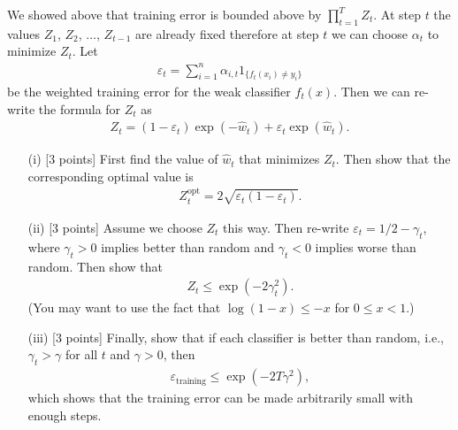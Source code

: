 \item {}  We showed above that training error is bounded above by $\prod_{t=1}^T Z_t$. At step $t$ the values $Z_1$, $Z_2$, $\ldots$, $Z_{t-1}$ are already fixed therefore at step $t$ we can choose $\alpha_t$ to minimize $Z_t$. Let
		\begin{align*}
			\varepsilon_t 
			= \sum_{i=1}^n \alpha_{i, t} 1_{\{f_t(x_i) \neq y_i\}}
		\end{align*}
	be the weighted training error for the weak classifier $f_t(x)$. Then we can re-write the formula for $Z_t$ as
	\begin{align*}
		Z_t = (1-\varepsilon_t) \exp(-\hat{w}_t) + \varepsilon_t \exp(\hat{w}_t).
	\end{align*}
 \begin{enumerate}
 	\item [(i)] [3 points] First find the value of  $\hat{w}_t$ that minimizes $Z_t$. Then show that the corresponding optimal value is
	\begin{align*}
		Z^{\text{opt}}_t
		= 2 \sqrt{\varepsilon_t (1-\varepsilon_t)}.
	\end{align*}
	\item [(ii)] [3 points] Assume we choose $Z_t$ this way. Then re-write $\varepsilon_t = 1/2 - \gamma_t$, where $\gamma_t > 0$ implies better than random and $\gamma_t < 0$ implies worse than random. Then show that
	\begin{align*}
		Z_t \le \exp(-2 \gamma_t^2).
	\end{align*}
	(You may want to use the fact that $\log(1 - x) \le  -x$ for $0 \le  x < 1$.)
	\item [(iii)] [3 points] Finally, show that if each classifier is better than random, i.e.,  $\gamma_t > \gamma$ for all $t$ and $\gamma > 0$, then
	\begin{align*}
			\varepsilon_{\text{training}}
		\le \exp(-2T \gamma^2),
	\end{align*}
	which shows that the training error can be made arbitrarily small with enough steps.
 \end{enumerate}